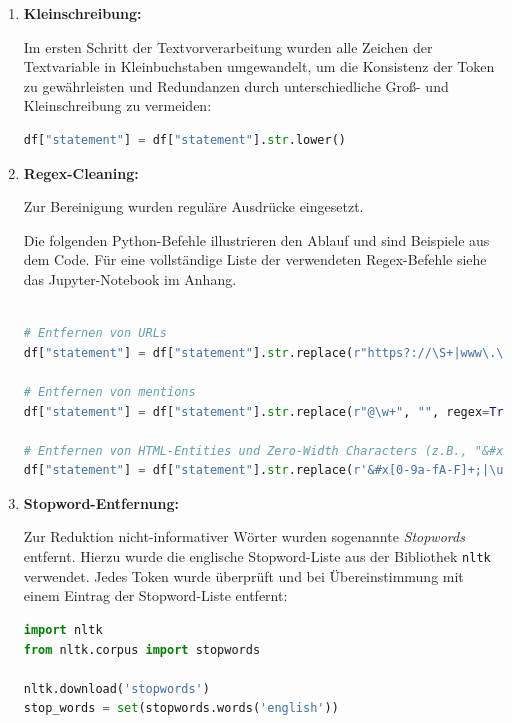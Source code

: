 \begin{enumerate}
    \item \textbf{Kleinschreibung:}
    
    Im ersten Schritt der Textvorverarbeitung wurden alle Zeichen der Textvariable in Kleinbuchstaben umgewandelt, um die Konsistenz der Token zu gewährleisten und Redundanzen durch unterschiedliche Groß- und Kleinschreibung zu vermeiden:

\begin{lstlisting}[language=Python, caption={Umwandlung in Kleinschreibung}]
df["statement"] = df["statement"].str.lower()
\end{lstlisting}

    \item \textbf{Regex-Cleaning:}
    
    Zur Bereinigung wurden reguläre Ausdrücke eingesetzt.
    
    Die folgenden Python-Befehle illustrieren den Ablauf und sind Beispiele aus dem Code. Für eine vollständige Liste der verwendeten Regex-Befehle siehe das Jupyter-Notebook im Anhang.

\begin{lstlisting}[language=Python, caption={Regex-Cleaning der Social-Media-Texte}]

# Entfernen von URLs
df["statement"] = df["statement"].str.replace(r"https?://\S+|www\.\S+", "", regex=True)

# Entfernen von mentions
df["statement"] = df["statement"].str.replace(r"@\w+", "", regex=True)

# Entfernen von HTML-Entities und Zero-Width Characters (z.B., "&#x27;", "\u200b")
df["statement"] = df["statement"].str.replace(r'&#x[0-9a-fA-F]+;|\u200b', '', regex=True)
\end{lstlisting}

    \item \textbf{Stopword-Entfernung:}

Zur Reduktion nicht-informativer Wörter wurden sogenannte \textit{Stopwords} entfernt. Hierzu wurde die englische Stopword-Liste aus der Bibliothek \texttt{nltk} verwendet. Jedes Token wurde überprüft und bei Übereinstimmung mit einem Eintrag der Stopword-Liste entfernt:

\begin{lstlisting}[language=Python, caption={Entfernung englischer Stopwords mit nltk}]
import nltk
from nltk.corpus import stopwords

nltk.download('stopwords')
stop_words = set(stopwords.words('english'))


\end{lstlisting}
\end{enumerate}
